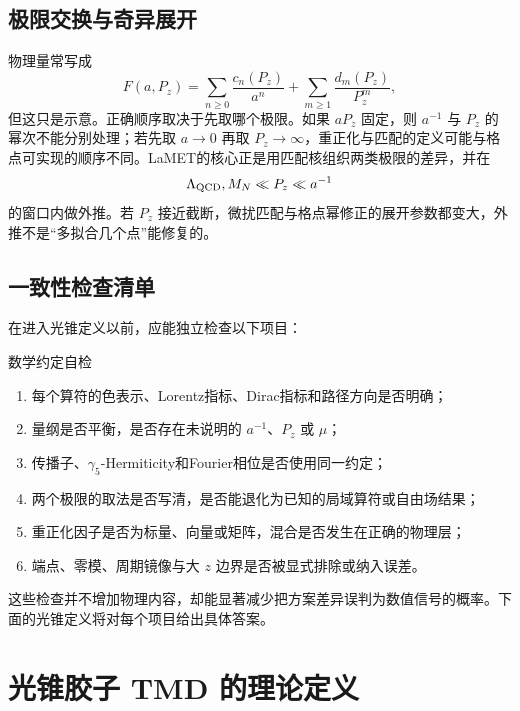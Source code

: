 \documentclass[UTF8,12pt,a4paper,twoside,openany]{ctexbook}
\begin{document}
\section{极限交换与奇异展开}

物理量常写成
\begin{equation}
  F(a,P_z)=\sum_{n\ge0}\frac{c_n(P_z)}{a^n}
  +\sum_{m\ge1}\frac{d_m(P_z)}{P_z^m},
  \label{eq:toolbox-expansions}
\end{equation}
但这只是示意。正确顺序取决于先取哪个极限。如果 \(aP_z\) 固定，则 \(a^{-1}\) 与 \(P_z\) 的幂次不能分别处理；若先取 \(a\to0\) 再取 \(P_z\to\infty\)，重正化与匹配的定义可能与格点可实现的顺序不同。LaMET的核心正是用匹配核组织两类极限的差异，并在
\begin{equation}
  \Lambda_{\rm QCD},M_N\ll P_z\ll a^{-1}
  \label{eq:toolbox-lametwindow}
\end{equation}
的窗口内做外推。若 \(P_z\) 接近截断，微扰匹配与格点幂修正的展开参数都变大，外推不是“多拟合几个点”能修复的。

\section{一致性检查清单}

在进入光锥定义以前，应能独立检查以下项目：
\begin{checkpointbox}{数学约定自检}
\begin{enumerate}
  \item 每个算符的色表示、Lorentz指标、Dirac指标和路径方向是否明确；
  \item 量纲是否平衡，是否存在未说明的 \(a^{-1}\)、\(P_z\) 或 \(\mu\)；
  \item 传播子、\(\gamma_5\)-Hermiticity和Fourier相位是否使用同一约定；
  \item 两个极限的取法是否写清，是否能退化为已知的局域算符或自由场结果；
  \item 重正化因子是否为标量、向量或矩阵，混合是否发生在正确的物理层；
  \item 端点、零模、周期镜像与大 \(z\) 边界是否被显式排除或纳入误差。
\end{enumerate}
\end{checkpointbox}

这些检查并不增加物理内容，却能显著减少把方案差异误判为数值信号的概率。下面的光锥定义将对每个项目给出具体答案。

\clearpage
\chapter{光锥胶子 TMD 的理论定义}
\end{document}
